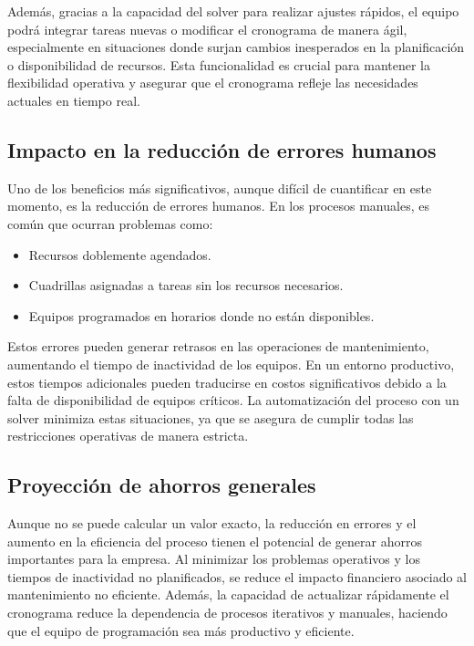 \documentclass{article}
\begin{document}
Además, gracias a la capacidad del solver para realizar ajustes rápidos, el equipo podrá integrar tareas nuevas o modificar el cronograma de manera ágil, especialmente en situaciones donde surjan cambios inesperados en la planificación o disponibilidad de recursos. Esta funcionalidad es crucial para mantener la flexibilidad operativa y asegurar que el cronograma refleje las necesidades actuales en tiempo real.

\subsection{Impacto en la reducción de errores humanos}

Uno de los beneficios más significativos, aunque difícil de cuantificar en este momento, es la reducción de errores humanos. En los procesos manuales, es común que ocurran problemas como:
\begin{itemize}
    \item Recursos doblemente agendados.
    \item Cuadrillas asignadas a tareas sin los recursos necesarios.
    \item Equipos programados en horarios donde no están disponibles.
\end{itemize}

Estos errores pueden generar retrasos en las operaciones de mantenimiento, aumentando el tiempo de inactividad de los equipos. En un entorno productivo, estos tiempos adicionales pueden traducirse en costos significativos debido a la falta de disponibilidad de equipos críticos. La automatización del proceso con un solver minimiza estas situaciones, ya que se asegura de cumplir todas las restricciones operativas de manera estricta.

\subsection{Proyección de ahorros generales}

Aunque no se puede calcular un valor exacto, la reducción en errores y el aumento en la eficiencia del proceso tienen el potencial de generar ahorros importantes para la empresa. Al minimizar los problemas operativos y los tiempos de inactividad no planificados, se reduce el impacto financiero asociado al mantenimiento no eficiente. Además, la capacidad de actualizar rápidamente el cronograma reduce la dependencia de procesos iterativos y manuales, haciendo que el equipo de programación sea más productivo y eficiente.
\end{document}
